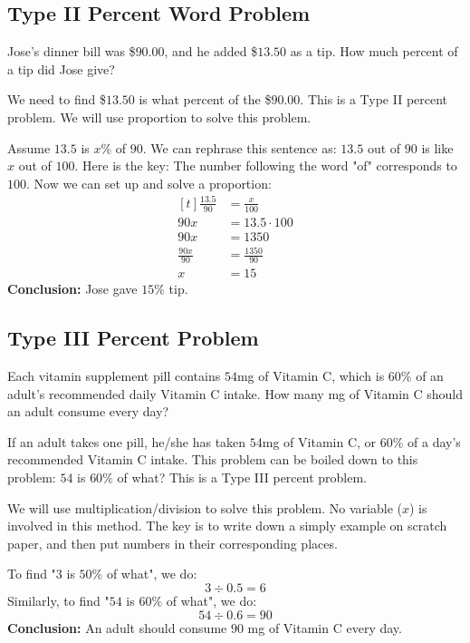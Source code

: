 \subsection{Type II Percent Word Problem}
\begin{myexample}
Jose's dinner bill was \$$90.00$, and he added \$$13.50$ as a tip. How much percent of a tip did Jose give?
\end{myexample}
\begin{solution}
We need to find \$$13.50$ is what percent of the \$$90.00$. This is a Type II percent problem. We will use proportion to solve this problem.

Assume $13.5$ is $x\%$ of $90$. We can rephrase this sentence as: $13.5$ out of $90$ is like $x$ out of $100$. Here is the key: The number following the word "of" corresponds to $100$. Now we can set up and solve a proportion:
\[
\begin{aligned}[t]
	\frac{13.5}{90} &= \frac{x}{100} \\
	90x &= 13.5 \cdot 100 \\
	90x &= 1350 \\
	\frac{90x}{90} &= \frac{1350}{90} \\
	x &= 15
\end{aligned}
\]
\textbf{Conclusion:} Jose gave $15\%$ tip.

\end{solution}

\subsection{Type III Percent Problem}
\begin{myexample}
Each vitamin supplement pill contains $54$mg of Vitamin C, which is $60\%$ of an adult's recommended daily Vitamin C intake. How many mg of Vitamin C should an adult consume every day?
\end{myexample}
\begin{solution}

If an adult takes one pill, he/she has taken $54$mg of Vitamin C, or $60\%$ of a day's recommended Vitamin C intake. This problem can be boiled down to this problem: $54$ is $60\%$ of what? This is a Type III percent problem.

We will use multiplication/division to solve this problem. No variable ($x$) is involved in this method. The key is to write down a simply example on scratch paper, and then put numbers in their corresponding places.

To find "$3$ is $50\%$ of what", we do:
\[ 3\div0.5=6 \]
Similarly, to find "$54$ is $60\%$ of what", we do:
\[ 54\div0.6=90 \]
\textbf{Conclusion:} An adult should consume $90$ mg of Vitamin C every day.

\end{solution}


